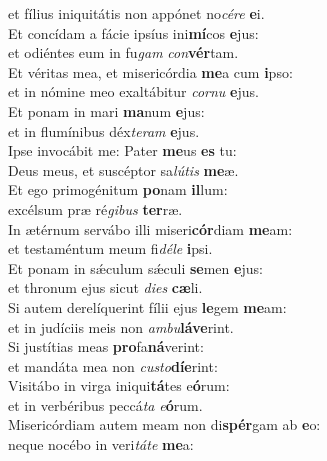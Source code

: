 \evenverse et fílius iniquitátis non appónet no\textit{cé}\textit{re} \textbf{e}i.\\
\oddverse Et concídam a fácie ipsíus ini\textbf{mí}cos \textbf{e}jus:~\*\\
\oddverse et odiéntes eum in fu\textit{gam} \textit{con}\textbf{vér}tam.\\
\evenverse Et véritas mea, et misericórdia \textbf{me}a cum \textbf{i}pso:~\*\\
\evenverse et in nómine meo exaltábitur \textit{cor}\textit{nu} \textbf{e}jus.\\
\oddverse Et ponam in mari \textbf{ma}num \textbf{e}jus:~\*\\
\oddverse et in flumínibus déx\textit{te}\textit{ram} \textbf{e}jus.\\
\evenverse Ipse invocábit me: Pater \textbf{me}us \textbf{es} tu:~\*\\
\evenverse Deus meus, et suscéptor sa\textit{lú}\textit{tis} \textbf{me}æ.\\
\oddverse Et ego primogénitum \textbf{po}nam \textbf{il}lum:~\*\\
\oddverse excélsum præ ré\textit{gi}\textit{bus} \textbf{ter}ræ.\\
\evenverse In ætérnum servábo illi miseri\textbf{cór}diam \textbf{me}am:~\*\\
\evenverse et testaméntum meum fi\textit{dé}\textit{le} \textbf{i}psi.\\
\oddverse Et ponam in sǽculum sǽculi \textbf{se}men \textbf{e}jus:~\*\\
\oddverse et thronum ejus sicut \textit{di}\textit{es} \textbf{cæ}li.\\
\evenverse Si autem derelíquerint fílii ejus \textbf{le}gem \textbf{me}am:~\*\\
\evenverse et in judíciis meis non \textit{am}\textit{bu}\textbf{lá}\textbf{ve}rint.\\
\oddverse Si justítias meas \textbf{pro}fa\textbf{ná}verint:~\*\\
\oddverse et mandáta mea non \textit{cu}\textit{sto}\textbf{dí}\textbf{e}rint:\\
\evenverse Visitábo in virga iniqui\textbf{tá}tes e\textbf{ó}rum:~\*\\
\evenverse et in verbéribus peccá\textit{ta} \textit{e}\textbf{ó}rum.\\
\oddverse Misericórdiam autem meam non di\textbf{spér}gam ab \textbf{e}o:~\*\\
\oddverse neque nocébo in veri\textit{tá}\textit{te} \textbf{me}a:\\
